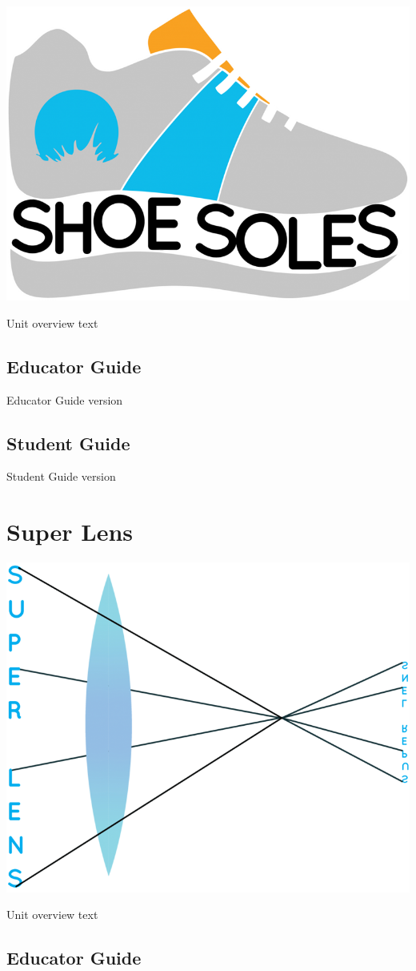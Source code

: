 \documentclass[]{book}
\begin{document}
\begin{center}\includegraphics[width=0.5\linewidth]{img/shoeSoles} \end{center}

Unit overview text

\section{Educator Guide}\label{educator-guide-5}

Educator Guide version

\section{Student Guide}\label{student-guide-5}

Student Guide version

\chapter{Super Lens}\label{super-lens}

\begin{center}\includegraphics[width=0.5\linewidth]{img/superLens} \end{center}

Unit overview text

\section{Educator Guide}\label{educator-guide-6}
\end{document}
